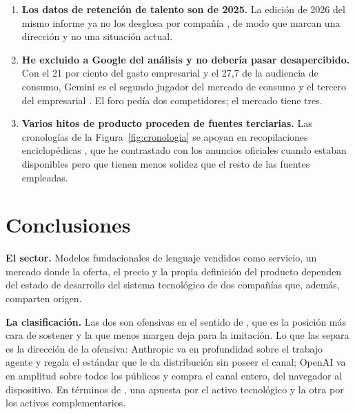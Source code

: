 \documentclass[11pt,letterpaper]{article}
\begin{document}
\begin{enumerate}
    auditados, y la propia fuente que da los 65.000 millones advierte de que las
    dos pueden calcular la métrica de forma distinta
    \parencite{techcrunch2026ingresos}. Las razones de monetización del Panel B
    de la Figura~\ref{fig:mercado} heredan toda esa incertidumbre y además la de
    los recuentos de plantilla, que proceden de fuentes terciarias.
  \item \textbf{Los datos de retención de talento son de 2025.} La edición de
    2026 del mismo informe ya no los desglosa por compañía
    \parencite{signalfire2025,signalfire2026}, de modo que marcan una dirección
    y no una situación actual.
  \item \textbf{He excluido a Google del análisis y no debería pasar
    desapercibido.} Con el 21 por ciento del gasto empresarial y el 27,7 de la
    audiencia de consumo, Gemini es el segundo jugador del mercado de consumo y
    el tercero del empresarial \parencite{menlo2025,sensortower2026}. El foro
    pedía dos competidores; el mercado tiene tres.
  \item \textbf{Varios hitos de producto proceden de fuentes terciarias.} Las
    cronologías de la Figura~\ref{fig:cronologia} se apoyan en recopilaciones
    enciclopédicas \parencite{wikipedia2026claude,wikipedia2026gpt56}, que he
    contrastado con los anuncios oficiales cuando estaban disponibles pero que
    tienen menos solidez que el resto de las fuentes empleadas.
\end{enumerate}

\section*{Conclusiones}

\textbf{El sector.} Modelos fundacionales de lenguaje vendidos como servicio, un
mercado donde la oferta, el precio y la propia definición del producto dependen
del estado de desarrollo del sistema tecnológico de dos compañías que, además,
comparten origen.

\textbf{La clasificación.} Las dos son ofensivas en el sentido de
\textcite{freeman1997}, que es la posición más cara de sostener y la que menos
margen deja para la imitación. Lo que las separa es la dirección de la ofensiva:
Anthropic va en profundidad sobre el trabajo agente y regala el estándar que le
da distribución sin poseer el canal; OpenAI va en amplitud sobre todos los
públicos y compra el canal entero, del navegador al dispositivo. En términos de
\textcite{teece1986}, una apuesta por el activo tecnológico y la otra por los
activos complementarios.
\end{document}
